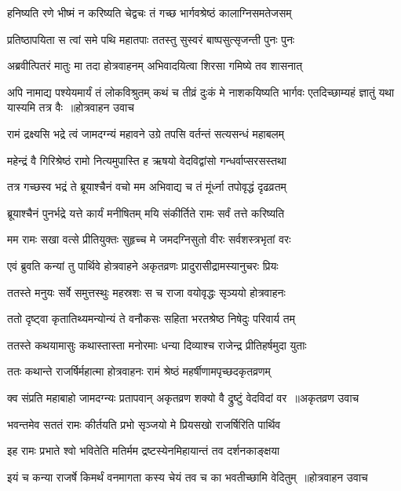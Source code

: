 \twolineshloka
{हनिष्यति रणे भीष्मं न करिष्यति चेद्वचः}
{तं गच्छ भार्गवश्रेष्ठं कालाग्निसमतेजसम्}


\twolineshloka
{प्रतिष्ठापयिता स त्वां समे पथि महातपाः}
{ततस्तु सुस्वरं बाष्पसुत्सृजन्ती पुनः पुनः}


\twolineshloka
{अब्रवीत्पितरं मातुः मा तदा होत्रवाहनम्}
{अभिवादयित्वा शिरसा गमिष्ये तव शासनात्}


\fourlineindentedshloka
{अपि नामाद्य पश्येयमार्यं तं लोकविश्रुतम्}
{कथं च तीव्रं दुःकं मे नाशकयिष्यति भार्गवः}
{एतदिच्छाम्यहं ज्ञातुं यथा यास्यमि तत्र वैः ॥होत्रवाहन उवाच}
{}


\twolineshloka
{रामं द्रक्ष्यसि भद्रे त्वं जामदग्न्यं महावने}
{उग्रे तपसि वर्तन्तं सत्यसन्धं महाबलम्}


\twolineshloka
{महेन्द्रं वै गिरिश्रेष्ठं रामो नित्यमुपास्ति ह}
{ऋषयो वेदविद्वांसो गन्धर्वाप्सरसस्तथा}


\twolineshloka
{तत्र गच्छस्व भद्रं ते ब्रूयाश्चैनं वचो मम}
{अभिवाद्य च तं मूंर्ध्ना तपोवृद्धं दृढव्रतम्}


\twolineshloka
{ब्रूयाश्चैनं पुनर्भद्रे यत्ते कार्यं मनीषितम्}
{मयि संकीर्तिते रामः सर्वं तत्ते करिष्यति}


\twolineshloka
{मम रामः सखा वत्से प्रीतियुक्तः सुहृच्च मे}
{जमदग्निसुतो वीरः सर्वशस्त्रभृतां वरः}


\twolineshloka
{एवं ब्रुवति कन्यां तु पार्थिवे होत्रवाहने}
{अकृतव्रणः प्रादुरासीद्रामस्यानुचरः प्रियः}


\twolineshloka
{ततस्ते मनुयः सर्वे समुत्तस्थुः महस्रशः}
{स च राजा वयोवृद्धः सृञ्ययो होत्रवाहनः}


\twolineshloka
{ततो दृष्ट्वा कृतातिथ्यमन्योन्यं ते वनौकसः}
{सहिता भरतश्रेष्ठ निषेदुः परिवार्य तम्}


\twolineshloka
{ततस्ते कथयामासुः कथास्तास्ता मनोरमाः}
{धन्या दिव्याश्च राजेन्द्र प्रीतिहर्षमुदा युताः}


\twolineshloka
{ततः कथान्ते राजर्षिर्महात्मा होत्रवाहनः}
{रामं श्रेष्ठं महर्षीणामपृच्छदकृतव्रणम्}


\threelineshloka
{क्व संप्रति महाबाहो जामदग्न्यः प्रतापवान्}
{अकृतव्रण शक्यो वै द्रुष्टुं वेदविदां वर ॥अकृतव्रण उवाच}
{}


\twolineshloka
{भवन्तमेव सततं रामः कीर्तयति प्रभो}
{सृञ्जयो मे प्रियसखो राजर्षिरिति पार्थिव}


\twolineshloka
{इह रामः प्रभाते श्वो भवितेति मतिर्मम}
{द्रष्टस्येनमिहायान्तं तव दर्शनकाङ्क्षया}


\threelineshloka
{इयं च कन्या राजर्षे किमर्थं वनमागता}
{कस्य चेयं तव च का भवतीच्छामि वेदितुम् ॥होत्रवाहन उवाच}
{}


